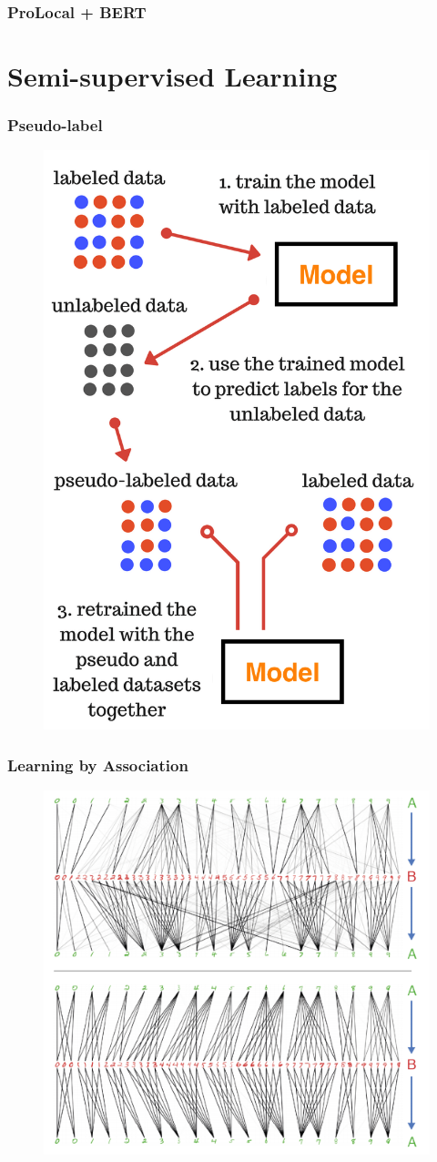 \documentclass{beamer}
\begin{document}
\begin{frame}
\frametitle{ProLocal + BERT}
\end{frame}

\section{Semi-supervised Learning}
\begin{frame}
\frametitle{Pseudo-label}
\begin{figure}[htp]
\centering
\includegraphics[width=.4\textwidth]{img/pseudo-labeling.png}
\end{figure}
\end{frame}

\begin{frame}
\frametitle{Learning by Association}
\begin{figure}[htp]
\centering
\includegraphics[width=.65\textwidth]{img/association.png}
\end{figure}
\end{frame}
\end{document}
